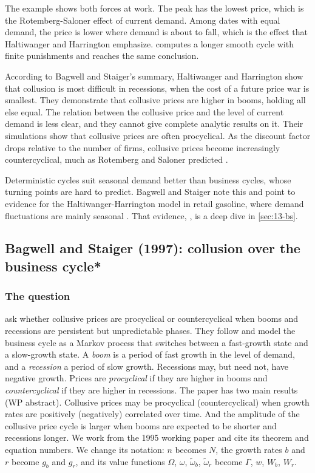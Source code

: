 The example shows both forces at work. The peak has the lowest price, which is the Rotemberg-Saloner effect of current
demand. Among dates with equal demand, the price is lower where demand is about to fall, which is the effect that
Haltiwanger and Harrington emphasize.  computes a longer smooth cycle with finite
punishments and reaches the same conclusion.

According to Bagwell and Staiger's summary, Haltiwanger and Harrington show that collusion is most difficult in
recessions, when the cost of a future price war is smallest. They demonstrate that collusive prices are higher in
booms, holding all else equal. The relation between the collusive price and the level of current demand is less clear,
and they cannot give complete analytic results on it. Their simulations show that collusive prices are often
procyclical. As the discount factor drops relative to the number of firms, collusive prices become increasingly
countercyclical, much as Rotemberg and Saloner predicted \citep[p.~2]{BagwellStaiger1995}.

Deterministic cycles suit seasonal demand better than business cycles, whose turning points are hard to predict.
Bagwell and Staiger note this and point to evidence for the Haltiwanger-Harrington model in retail gasoline, where
demand fluctuations are mainly seasonal \citep[fn.~5]{BagwellStaiger1995}. That evidence, \citet{BorensteinShepard1996},
is a deep dive in \cref{sec:13-bs}.

\subsection{Bagwell and Staiger (1997): collusion over the business cycle*}\label{sec:12-bs}

\subsubsection{The question}

\citet{BagwellStaiger1997} ask whether collusive prices are procyclical or countercyclical when booms and recessions
are persistent but unpredictable phases. They follow \citet{Hamilton1989} and model the business cycle as a Markov
process that switches between a fast-growth state and a slow-growth state. A \emph{boom} is a period of fast growth in
the level of demand, and a \emph{recession} a period of slow growth. Recessions may, but need not, have negative growth.
Prices are \emph{procyclical} if they are higher in booms and \emph{countercyclical} if they are higher in recessions.
The paper has two main results (WP abstract). Collusive prices may be procyclical (countercyclical) when growth rates
are positively (negatively) correlated over time. And the amplitude of the collusive price cycle is larger when booms
are expected to be shorter and recessions longer. We work from the 1995 working paper
\citep{BagwellStaiger1995} and cite its theorem and equation numbers. We change its notation: $n$ becomes $N$, the
growth rates $b$ and $r$ become $g_b$ and $g_r$, and its value functions $\Omega$, $\omega$, $\tilde\omega_b$, $\tilde\omega_r$
become $\Gamma$, $w$, $W_b$, $W_r$.

